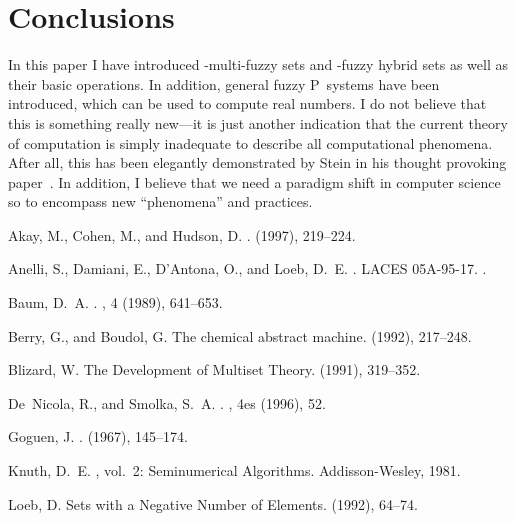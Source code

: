 \documentclass{amsart}
\theoremstyle{definition}
\begin{document}
\section{Conclusions}
In this paper I have introduced -multi-fuzzy sets and -fuzzy hybrid sets as well as
their basic operations. In addition, general fuzzy P~systems have been introduced, which 
can be used to compute real numbers. I do not believe that this is something really new---it 
is just another indication that the current theory of computation is simply inadequate to describe 
all computational phenomena. After all, this has been elegantly demonstrated by Stein in his 
thought provoking paper~\cite{stein99}. In addition, I believe that we need a paradigm shift in 
computer science so to encompass new ``phenomena'' and practices. 
\begin{thebibliography}{10}

{\sc Akay, M., Cohen, M., and Hudson, D.}
.
 (1997), 219--224.

{\sc Anelli, S., Damiani, E., D'Antona, O., and Loeb, D.~E.}
.
\newblock LACES 05A-95-17.
.

{\sc Baum, D.~A.}
.
, 4 (1989), 641--653.

{\sc Berry, G., and Boudol, G.}
\newblock The chemical abstract machine.
 (1992), 217--248.

{\sc Blizard, W.}
\newblock The {D}evelopment of {M}ultiset {T}heory.
 (1991), 319--352.

{\sc De~Nicola, R., and Smolka, S.~A.}
.
, 4es (1996), 52.

{\sc Goguen, J.}
.
 (1967),
  145--174.

{\sc Knuth, D.~E.}
, vol.~2: {S}eminumerical
  {A}lgorithms.
\newblock Addisson-Wesley, 1981.

{\sc Loeb, D.}
\newblock Sets with a {N}egative {N}umber of {E}lements.
 (1992), 64--74.


\end{thebibliography}
\end{document}
